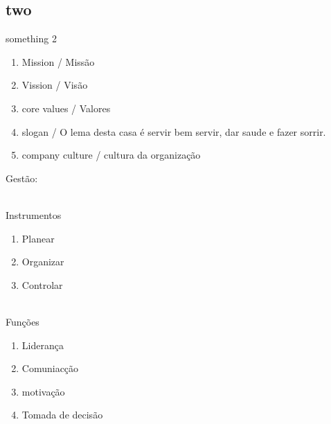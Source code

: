 \subsection{two}
something 2
\begin{enumerate}
\item Mission / Missão
\item Vission / Visão
\item core values / Valores
\item slogan / O lema desta casa é servir bem servir, dar saude e fazer sorrir.
\item company culture / cultura da organização
\end{enumerate}
\newpage
Gestão:\\ \\
\begin{minipage}{20cm}
\begin{minipage}{5cm}
Instrumentos
\begin{enumerate}
\item Planear
\item Organizar
\item Controlar\\ \\
\end{enumerate}
\end{minipage}
\begin{minipage}{5cm}
Funções
\begin{enumerate}
\item Liderança
\item Comuniacção
\item motivação
\item Tomada de decisão
\end{enumerate}
\end{minipage}
\end{minipage}


\newpage
